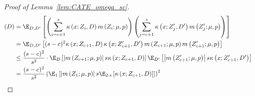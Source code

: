 \begin{proof}[Proof of Lemma~\ref{lem:CATE_omega_sc}]
\begin{equation}
	\end{equation}
	\begin{equation}
		\begin{aligned}
			(D)
			& = \E_{D, D^{\prime}}\left[\left(\sum_{i = c + 1}^{s} \kappa\left(x; Z_{i}, D\right) m\left(Z_{i}; \mu, p\right)\right)
            \left(\sum_{j = c + 1}^{s} \kappa\left(x; Z_{j}^{\prime}, D^{\prime}\right) m\left(Z_{j}^{\prime}; \mu, p\right)\right)\right] \\
			& = \E_{D, D^{\prime}}\left[(s-c)^2 \kappa\left(x; Z_{c+1}, D\right)\kappa\left(x; Z_{c+1}^{\prime}, D^{\prime}\right)
			 m\left(Z_{c+1}; \mu, p\right)  m\left(Z_{c+1}^{\prime}; \mu, p\right)\right] \\
			 & \leq \frac{(s-c)^2}{s^2} \cdot \E_{D}\left[\left|m\left(Z_{c+1}; \mu, p\right)\right| s \kappa\left(x; Z_{c+1}, D\right)\right]
			 \E_{D^{\prime}}\left[\left|m\left(Z_{c+1}^{\prime}; \mu, p\right)\right| s \kappa\left(x; Z_{c+1}^{\prime}, D^{\prime}\right) \right]\\
			 & = \frac{(s-c)^2}{s^2} \left(\E_{1}\left[\left|m\left(Z_{1}; \mu, p\right)\right| s \E_{2:s}\left[\kappa\left(x; Z_{c+1}, D\right)\right]\right]\right)^2
		\end{aligned}
	\end{equation}
\end{proof}